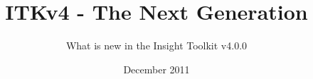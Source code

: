 \documentclass[18pt]{beamer}
\title[ITKv4]{ITKv4 - The Next Generation}
\subtitle[ITKv4]{What is new in the Insight Toolkit v4.0.0}
\institute[Insight Software Consortium]{Insight Software Consortium}
\date[December 2011]{December 2011}
\newcommand{\centeredlargetext}[3]{
{
\setbeamertemplate{background}{}
\setbeamertemplate{navigation symbols}{}
\setbeamercolor{background canvas}{bg={#1}}
\color{#2}
\begin{frame}[plain]
\fontsize{36pt}{36pt}\selectfont
\center
\begin{center}
{#3}
\end{center}
\end{frame}
}}
\begin{document}
\begin{frame}
\titlepage
\end{frame}






%


%


%

%

%

%

%

%


%



\end{document}

